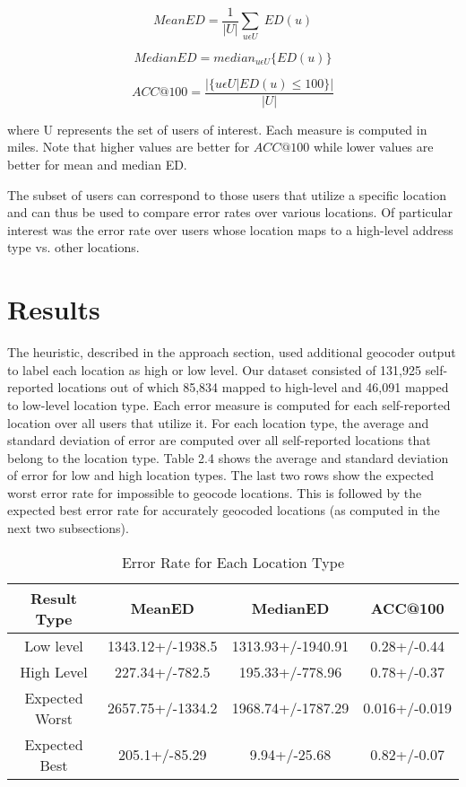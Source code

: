 \begin{equation}
MeanED = \frac{1}{|U|}\sum_{u \epsilon U}\ ED(u)
\end{equation}

\begin{equation}
MedianED = median_{u \epsilon U}\{ED(u)\}
\end{equation}

\begin{equation}
ACC@100 = \frac{|\{u \epsilon U|ED(u)\leq 100\}|}{|U|}
\end{equation}

where U represents the set of users of interest. Each measure is computed in miles. Note that higher values are better for $ACC@100$ while lower values are better for mean and median ED.

The subset of users can correspond to those users that utilize a specific location and can thus be used to compare error rates over various locations. Of particular interest was the error rate over users whose location maps to a high-level address type vs. other locations.

\section{Results}

The heuristic, described in the approach section, used additional geocoder output to label each location as high or low level. Our dataset consisted of 131,925 self-reported locations out of which 85,834 mapped to high-level and 46,091 mapped to low-level location type. Each error measure is computed for each self-reported location over all users that utilize it. For each location type, the average and standard deviation of error are computed over all self-reported locations that belong to the location type. Table 2.4 shows the average and standard deviation of error for low and high location types. The last two rows show the expected worst error rate for impossible to geocode locations. This is followed by the expected best error rate for accurately geocoded locations (as computed in the next two subsections). 

\begin{table}
\small
\renewcommand{\arraystretch}{1.2}
\caption{Error Rate for Each Location Type}
\label{table_ch2_4}
\centering
\begin{tabular}{|c|c|c|c|}
\hline
\bfseries Result Type & \bfseries MeanED & \bfseries MedianED & \bfseries ACC@100\\
\hline
Low level&1343.12+/-1938.5&1313.93+/-1940.91&0.28+/-0.44\\
\hline
High Level&227.34+/-782.5&195.33+/-778.96&0.78+/-0.37\\
\hline
Expected Worst&2657.75+/-1334.2&1968.74+/-1787.29&0.016+/-0.019\\
\hline
Expected Best&205.1+/-85.29&9.94+/-25.68&0.82+/-0.07\\
\hline
\end{tabular}
\end{table}

